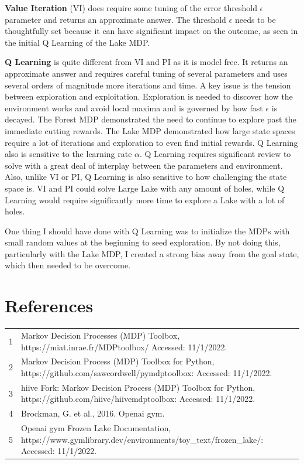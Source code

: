 \documentclass[letterpaper]{article} %
\begin{document}
\textbf{Value Iteration} (VI) does require some tuning of the error threshold $\epsilon$ parameter and returns an approximate answer.   The threshold $\epsilon$ needs to be thoughtfully set because it can have significant impact on the outcome, as seen in the initial Q Learning of the Lake MDP.  

\textbf{Q Learning} is quite different from VI and PI as it is model free.  It returns an approximate answer and requires careful tuning of several parameters and uses several orders of magnitude more iterations and time.  A key issue is the tension between exploration and exploitation.  Exploration is needed to discover how the environment works and avoid local maxima and is governed by how fast $\epsilon$ is decayed. The Forest MDP demonstrated the need to continue to explore past the immediate cutting rewards.  The Lake MDP demonstrated how large state spaces require a lot of iterations and exploration to even find initial rewards.  Q Learning also is sensitive to the learning rate $\alpha$.  Q Learning requires significant review to solve with a great deal of interplay between the parameters and environment.  Also, unlike VI or PI, Q Learning is also sensitive to how challenging the state space is.  VI and PI could solve Large Lake with any amount of holes, while Q Learning would require significantly more time to explore a Lake with a lot of holes.

One thing I should have done with Q Learning was to initialize the MDPs with small random values at the beginning to seed exploration.  By not doing this, particularly with the Lake MDP, I created a strong bias away from the goal state, which then needed to be overcome. 

\section{References}
\begin{tabular}{l p{2.75in}}
\\
1 & Markov Decision Processes (MDP) Toolbox, https://miat.inrae.fr/MDPtoolbox/ Accessed: 11/1/2022.
\\
2 & Markov Decision Process (MDP) Toolbox for Python, https://github.com/sawcordwell/pymdptoolbox: Accessed: 11/1/2022.
\\
3 & hiive Fork: Markov Decision Process (MDP) Toolbox for Python, https://github.com/hiive/hiivemdptoolbox: Accessed: 11/1/2022.
\\
4 & Brockman, G. et al., 2016. Openai gym.
\\
5 & Openai gym Frozen Lake Documentation,  https://www.gymlibrary.dev/environments/toy\_text/frozen\_lake/: Accessed: 11/1/2022.

\end{tabular}
\end{document}
